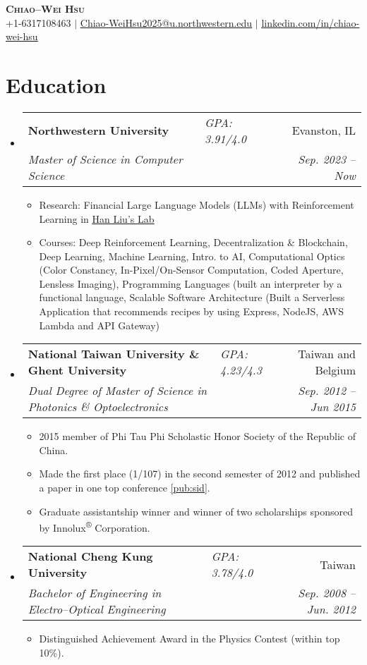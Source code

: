 \documentclass[letterpaper,11pt]{article}
\makeatletter
\newcommand{\resumeItem}[1]{
  \item\small{
    {#1 \vspace{-2pt}}
  }
}
\newcommand{\resumeSubheadingII}[5]{
  \vspace{-2pt}\item
    \begin{tabular*}{0.97\textwidth}[t]{ll@{\extracolsep{\fill}}r}
      \textbf{#1} & \textit{\small#5} & #2 \\
      \textit{\small#3} & \textit{} & \textit{\small #4} \\
    \end{tabular*}\vspace{-7pt}
}
\newcommand{\resumeSubHeadingListStart}{\begin{itemize}[leftmargin=0.1in, label={}]}
\newcommand{\resumeSubHeadingListEnd}{\end{itemize}}
\newcommand{\resumeItemListStart}{\begin{itemize}}
\newcommand{\resumeItemListEnd}{\end{itemize}\vspace{-5pt}}
\makeatother
\begin{document}

\begin{center}
    \textbf{\Huge \scshape Chiao--Wei Hsu} \\ \vspace{1pt}
    \small +1-6317108463 $|$ \href{mailto:Chiao-WeiHsu2025@u.northwestern.edu}{\underline{Chiao-WeiHsu2025@u.northwestern.edu}} $|$ 
    \href{https://linkedin.com/in/chiao-wei-hsu}{\underline{linkedin.com/in/chiao-wei-hsu}}
\end{center}


\section{Education}
  \resumeSubHeadingListStart
    \resumeSubheadingII
      {Northwestern University}{Evanston, IL}
      {Master of Science in Computer Science}{Sep. 2023 -- Now}{GPA: 3.91/4.0}
      \resumeItemListStart
        \resumeItem{Research: Financial Large Language Models (LLMs) with Reinforcement Learning in \href{https://magics.cs.northwestern.edu/index.html}{\underline{Han Liu's Lab}}}
        \resumeItem{Courses: Deep Reinforcement Learning, Decentralization \& Blockchain, Deep Learning, Machine Learning, Intro. to AI, Computational Optics (Color Constancy, In-Pixel/On-Sensor Computation, Coded Aperture, Lensless Imaging), Programming Languages (built an interpreter by a functional language, Scalable Software Architecture (Built a Serverless Application that recommends recipes by using Express, NodeJS, AWS Lambda and API Gateway)}
      \resumeItemListEnd
      
    \resumeSubheadingII
      {National Taiwan University \& Ghent University}{Taiwan and Belgium}
      {Dual Degree of Master of Science in Photonics \& Optoelectronics}{Sep. 2012 -- Jun 2015}{GPA: 4.23/4.3}
      \resumeItemListStart
        \resumeItem{2015 member of Phi Tau Phi Scholastic Honor Society of the Republic of China.}
        \resumeItem{Made the first place (1/107) in the second semester of 2012 and published a paper in one top conference \ref{pub:sid}.}
        \resumeItem {Graduate assistantship winner and winner of two scholarships sponsored by Innolux\textsuperscript{®} Corporation.}
      \resumeItemListEnd
    \resumeSubheadingII
      {National Cheng Kung University}{Taiwan}{Bachelor of Engineering in Electro--Optical Engineering}{Sep. 2008 -- Jun. 2012}{GPA: 3.78/4.0}
      \resumeItemListStart
        \resumeItem{Distinguished Achievement Award in the Physics Contest (within top 10\%).}
      \resumeItemListEnd
  \resumeSubHeadingListEnd
\end{document}
